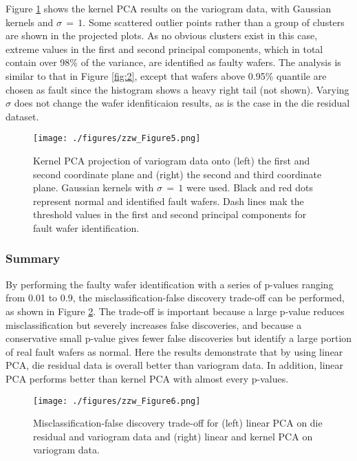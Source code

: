 \documentclass[english]{article}
\numberwithin{equation}{section}
\numberwithin{table}{section}
\numberwithin{figure}{section}
\begin{document}
Figure \ref{fig:5} shows the kernel PCA results on the variogram
data, with Gaussian kernels and $\sigma\,=\,1$. Some scattered outlier
points rather than a group of clusters are shown in the projected
plots. As no obvious clusters exist in this case, extreme values in
the first and second principal components, which in total contain
over 98\% of the variance, are identified as faulty wafers. The analysis
is similar to that in Figure \ref{fig:2}, except that wafers above
0.95\% quantile are chosen as fault since the histogram shows a heavy
right tail (not shown). Varying $\sigma$ does not change the wafer
idenfiticaion results, as is the case in the die residual dataset.

\begin{figure}[!tph]
\begin{centering}
\texttt{[image: ./figures/zzw\_Figure5.png]}
\par\end{centering}

\caption{Kernel PCA projection of variogram data onto (left) the first and
second coordinate plane and (right) the second and third coordinate
plane. Gaussian kernels with $\sigma\,=\,1$ were used. Black and
red dots represent normal and identified fault wafers. Dash lines
mak the threshold values in the first and second principal components
for fault wafer identification.\label{fig:5}}
\end{figure}



\subsubsection{Summary}
\hspace{12 pt}
By performing the faulty wafer identification with a series of p-values
ranging from 0.01 to 0.9, the misclassification-false discovery trade-off
can be performed, as shown in Figure \ref{fig:6}. The trade-off is
important because a large p-value reduces misclassification but severely
increases false discoveries, and because a conservative small p-value
gives fewer false discoveries but identify a large portion of real
fault wafers as normal. Here the results demonstrate that by using
linear PCA, die residual data is overall better than variogram data.
In addition, linear PCA performs better than kernel PCA with almost
every p-values. 

\begin{figure}[!tph]
\begin{centering}
\texttt{[image: ./figures/zzw\_Figure6.png]}
\par\end{centering}

\caption{Misclassification-false discovery trade-off for (left) linear PCA
on die residual and variogram data and (right) linear and kernel PCA
on variogram data. \label{fig:6}}

\end{figure}
\end{document}

